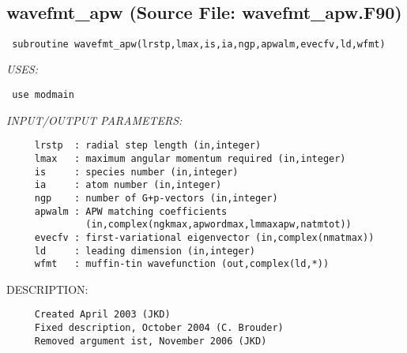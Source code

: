 \documentclass[11pt]{article}
\begin{document}















 
 
\mbox{}\hrulefill\ 
 
\subsection{wavefmt\_apw (Source File: wavefmt\_apw.F90)}


\begin{verbatim} subroutine wavefmt_apw(lrstp,lmax,is,ia,ngp,apwalm,evecfv,ld,wfmt)\end{verbatim}{\em USES:}
\begin{verbatim} use modmain\end{verbatim}{\em INPUT/OUTPUT PARAMETERS:}
\begin{verbatim}     lrstp  : radial step length (in,integer)
     lmax   : maximum angular momentum required (in,integer)
     is     : species number (in,integer)
     ia     : atom number (in,integer)
     ngp    : number of G+p-vectors (in,integer)
     apwalm : APW matching coefficients
              (in,complex(ngkmax,apwordmax,lmmaxapw,natmtot))
     evecfv : first-variational eigenvector (in,complex(nmatmax))
     ld     : leading dimension (in,integer)
     wfmt   : muffin-tin wavefunction (out,complex(ld,*))\end{verbatim}
{\sf DESCRIPTION:\\ }


  
\begin{verbatim}     Created April 2003 (JKD)
     Fixed description, October 2004 (C. Brouder)
     Removed argument ist, November 2006 (JKD)\end{verbatim}
\end{document}
